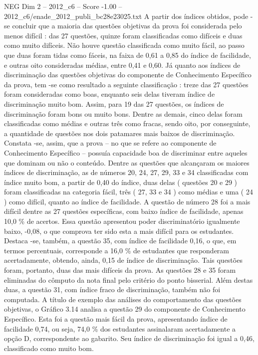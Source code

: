 \begin{textsample}{NEG Dim 2 – 2012\_c6 – Score -1.00 – 2012\_c6/enade\_2012\_publi\_bc28e23025.txt}
A partir dos índices obtidos, pode -se concluir que a maioria das questões objetivas da prova foi considerada pelo menos difícil : das 27 questões, quinze foram classificadas como difíceis e duas como muito difíceis.
Não houve questão classificada como muito fácil, ao passo que duas foram tidas como fáceis, na faixa de 0,61 a 0,85 do índice de facilidade, e outras oito consideradas médias, entre 0,41 e 0,60.
Já quanto aos índices de discriminação das questões objetivas do componente de Conhecimento Específico da prova, tem -se como resultado a seguinte classificação : treze das 27 questões foram consideradas como boas, enquanto seis delas tiveram índice de discriminação muito bom.
Assim, para 19 das 27 questões, os índices de discriminação foram bons ou muito bons.
Dentre as demais, cinco delas foram classificadas como médias e outras três como fracas, sendo oito, por conseguinte, a quantidade de questões nos dois patamares mais baixos de discriminação.
Constata -se, assim, que a prova – no que se refere ao componente de Conhecimento Específico – possuía capacidade boa de discriminar entre aqueles que dominam ou não o conteúdo.
Dentre as questões que alcançaram os maiores índices de discriminação, as de números 20, 24, 27, 29, 33 e 34 classificadas com índice muito bom, a partir de 0,40 do índice, duas delas ( questões 20 e 29 ) foram classificadas na categoria fácil, três ( 27, 33 e 34 ) como médias e uma ( 24 ) como difícil, quanto ao índice de facilidade.
A questão de número 28 foi a mais difícil dentre as 27 questões específicas, com baixo índice de facilidade, apenas 10,0 \% de acertos.
Essa questão apresentou poder discriminatório igualmente baixo, -0,08, o que comprova ter sido esta a mais difícil para os estudantes.
Destaca -se, também, a questão 35, com índice de facilidade 0,16, o que, em termos percentuais, corresponde a 16,0 \% de estudantes que responderam acertadamente, obtendo, ainda, 0,15 de índice de discriminação.
Tais questões foram, portanto, duas das mais difíceis da prova.
As questões 28 e 35 foram eliminadas do cômputo da nota final pelo critério do ponto bisserial.
Além destas duas, a questão 31, com índice fraco de discriminação, também não foi computada.
A título de exemplo das análises do comportamento das questões objetivas, o Gráfico 3.14 analisa a questão 29 do componente de Conhecimento Específico.
Esta foi a questão mais fácil da prova, apresentando índice de facilidade 0,74, ou seja, 74,0 \% dos estudantes assinalaram acertadamente a opção D, correspondente ao gabarito.
Seu índice de discriminação foi igual a 0,46, classificado como muito bom.

\end{textsample}
